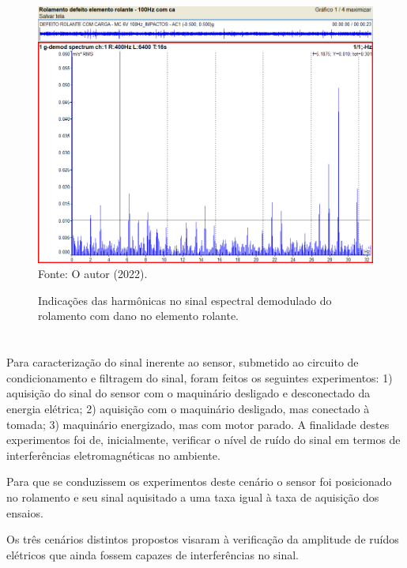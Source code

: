 \documentclass[
	12pt,				
	oneside,			
	a4paper,			
	english,			
	brazil,			
	]{abntex2ppgsi}
\begin{document}
\begin{figure}[H]
\centering
\caption {Indicações das harmônicas no sinal espectral demodulado do rolamento com dano no elemento rolante.}
\includegraphics[width=\textwidth,keepaspectratio]{DANO_ROLANTE_100HZ_HARMONICOS_2BSF} \\
Fonte: O autor (2022).
\label{DANO_ROLANTE_100HZ_HARMONICOS_2BSF}
\end{figure}


\section{}

Para caracterização do sinal inerente ao sensor, submetido ao circuito de condicionamento e filtragem do sinal, foram feitos os seguintes experimentos: 1) aquisição do sinal do sensor com o maquinário desligado e desconectado da energia elétrica; 2) aquisição com o maquinário desligado, mas conectado à tomada; 3) maquinário energizado, mas com motor parado. A finalidade destes experimentos foi de, inicialmente, verificar o nível de ruído do sinal em termos de interferências eletromagnéticas no ambiente.

Para que se conduzissem os experimentos deste cenário o sensor foi posicionado no rolamento e seu sinal aquisitado a uma taxa igual à taxa de aquisição dos ensaios. 

Os três cenários distintos propostos visaram à verificação da amplitude de ruídos elétricos que ainda fossem capazes de interferências no sinal. 
\end{document}
